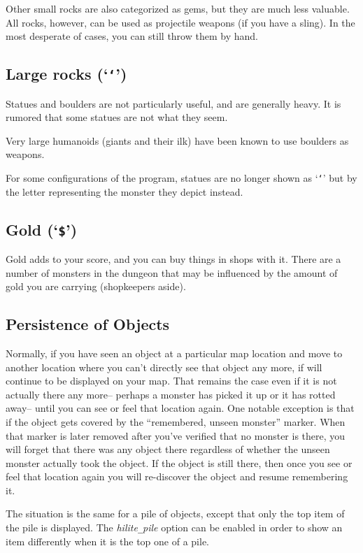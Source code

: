 Other small rocks are also categorized as gems, but they are much less
valuable.  All rocks, however, can be used as projectile weapons (if you
have a sling).  In the most desperate of cases, you can still throw them
by hand.

\subsection*{Large rocks (`{\tt `}')}
Statues and boulders are not particularly useful, and are generally
heavy.  It is rumored that some statues are not what they seem.

Very large humanoids (giants and their ilk) have been known to use boulders
as weapons.

For some configurations of the program, statues are no longer shown
as `{\tt `}'
but by the letter representing the monster they depict instead.

\subsection*{Gold (`{\tt \$}')}

Gold adds to your score, and you can buy things in shops with it.
There are a number
of monsters in the dungeon that may be influenced by the amount of gold
you are carrying (shopkeepers aside).

\subsection*{Persistence of Objects}

Normally, if you have seen an object at a particular map location and
move to another location where you can't directly see that object any
more, if will continue to be displayed on your map.
That remains the case even if it is not actually there any more--
perhaps a monster has picked it up or it has rotted away--
until you can see or feel that location again.
One notable exception is that if the object gets covered by the
``remembered, unseen monster'' marker.
When that marker is later removed
after you've verified that no monster is there, you will forget that
there was any object there regardless of whether the unseen monster
actually took the object.
If the object is still there, then once you see or feel that location
again you will re-discover the object and resume remembering it.

The situation is the same for a pile of objects, except that only the
top item of the pile is displayed.
The
{\it hilite\verb+_+pile\/}
option can be enabled in order to show an item differently when it is
the top one of a pile.

